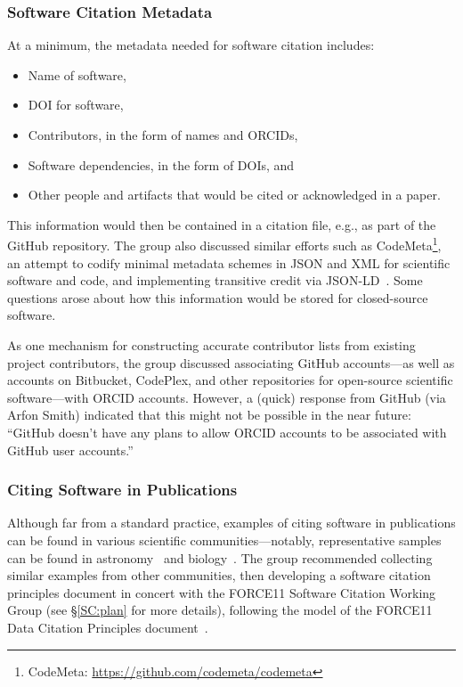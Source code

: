 \subsubsection{Software Citation Metadata}

At a minimum, the metadata needed for software citation %
includes:
\begin{itemize}
    \item Name of software,
    \item DOI for software,
    \item Contributors, in the form of names and ORCIDs,
    \item Software dependencies, in the form of DOIs, and
    \item Other people and artifacts that would be cited or acknowledged in a paper.
\end{itemize}
This information would then be contained in a citation file, e.g., as part of
the GitHub repository. The group also discussed similar efforts such as
CodeMeta\footnote{CodeMeta: \url{https://github.com/codemeta/codemeta}}, an
attempt to codify minimal metadata schemes in JSON and XML for scientific
software and code, and implementing transitive credit via
JSON-LD~\cite{wssspe2_katz}. Some questions arose about how this information
would be stored for closed-source software.

As one mechanism for constructing accurate contributor lists from existing
project contributors, the group discussed associating GitHub accounts---as well
as accounts on Bitbucket, CodePlex, and other repositories for open-source
scientific software---with ORCID accounts. However, a (quick) response from
GitHub (via Arfon Smith) indicated that this might not be possible in the near
future: ``GitHub doesn't have any plans to allow ORCID accounts to be associated
with GitHub user accounts.''

\subsubsection{Citing Software in Publications}

Although far from a standard practice, examples of citing software in
publications can be found in various scientific communities---notably,
representative samples can be found in astronomy~\cite{astronomy_SW_examples}
and biology~\cite{Howison2015}. The group recommended collecting similar
examples from other communities, then developing a software citation principles
document in concert with the FORCE11 Software Citation Working Group (see
\S\ref{SC:plan} for more details), following the model of the FORCE11 Data
Citation Principles document~\cite{DataCitation2014}.

